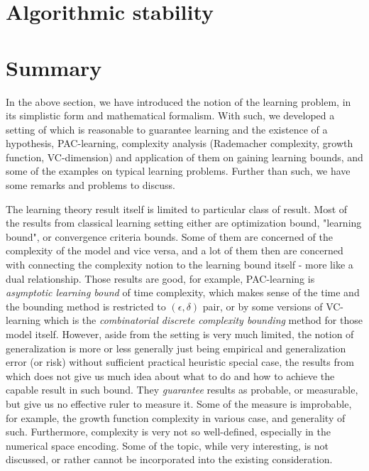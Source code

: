 \section{Algorithmic stability}

\section{Summary}

In the above section, we have introduced the notion of the learning problem, in its simplistic form and mathematical formalism. With such, we developed a setting of which is reasonable to guarantee learning and the existence of a hypothesis, PAC-learning, complexity analysis (Rademacher complexity, growth function, VC-dimension) and application of them on gaining learning bounds, and some of the examples on typical learning problems. Further than such, we have some remarks and problems to discuss. 

The learning theory result itself is limited to particular class of result. Most of the results from classical learning setting either are optimization bound, "learning bound", or convergence criteria bounds. Some of them are concerned of the complexity of the model and vice versa, and a lot of them then are concerned with connecting the complexity notion to the learning bound itself - more like a dual relationship. Those results are good, for example, PAC-learning is \textit{asymptotic learning bound} of time complexity, which makes sense of the time and the bounding method is restricted to $(\epsilon, \delta)$ pair, or by some versions of VC-learning which is the \textit{combinatorial discrete complexity bounding} method for those model itself. However, aside from the setting is very much limited, the notion of generalization is more or less generally just being empirical and generalization error (or risk) without sufficient practical heuristic special case, the results from which does not give us much idea about what to do and how to achieve the capable result in such bound. They \textit{guarantee} results as probable, or measurable, but give us no effective ruler to measure it. Some of the measure is improbable, for example, the growth function complexity in various case, and generality of such. Furthermore, complexity is very not so well-defined, especially in the numerical space encoding. Some of the topic, while very interesting, is not discussed, or rather cannot be incorporated into the existing consideration.

